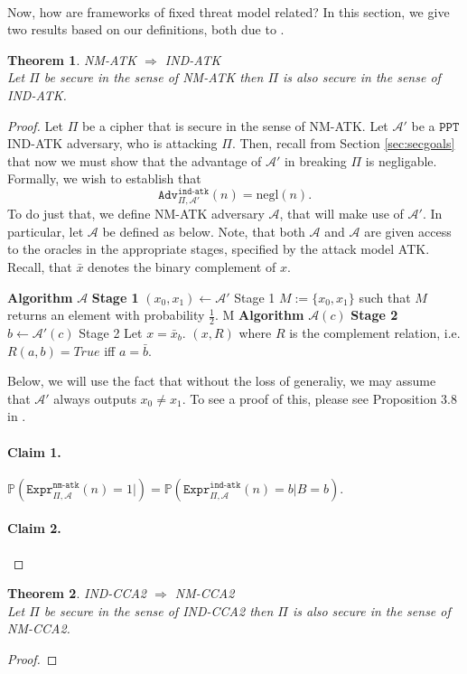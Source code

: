 \documentclass{article}
\newtheorem{theorem}{Theorem}[section]
\theoremstyle{definition}
\newcommand{\A}{\mathcal{A}}
\newcommand{\Prob}{\mathbb{P}}
\newcommand{\PPT}{\texttt{PPT}}
\newcommand{\negl}{\text{negl}}
\newcommand{\Expr}[2]{\texttt{Expr}^{\texttt{#1}}_{#2}}
\newcommand{\Adv}[2]{\texttt{Adv}^{\texttt{#1}}_{#2}}
\begin{document}
\paragraph{} Now, how are frameworks of fixed threat model related? In this
section, we give two results based on our definitions, both due to \cite{bellaresecurityrelations}.
\begin{theorem}{NM-ATK $\Rightarrow$ IND-ATK}\\
  Let $\Pi$ be secure in the sense of NM-ATK then $\Pi$ is also secure in the
  sense of IND-ATK.
\end{theorem}
\begin{proof}
  Let $\Pi$ be a cipher that is secure in the sense of NM-ATK. Let $\A'$ be
  a $\PPT$ IND-ATK adversary, who is attacking $\Pi$. Then, recall from Section
  \ref{sec:secgoals} that now we must show that the advantage of $\A'$ in
  breaking $\Pi$ is negligable. Formally, we wish to establish that
  \[
    \Adv{ind-atk}{\Pi, \A'}(n) = \negl(n).
  \]
  To do just that, we define NM-ATK adversary $\A$, that will make use of $\A'$.
  In particular, let $\A$ be defined as below. Note, that both $\A$ and $\A$ are
  given access to the oracles in the appropriate stages, specified by the attack
  model ATK. Recall, that $\bar{x}$ denotes the binary complement of $x$.
  \begin{algorithmic}
    \State \textbf{Algorithm} $\A$ \textbf{Stage 1}
    \State $(x_0, x_1) \leftarrow \A'$ Stage 1
    \State $M:= \{x_0, x_1\}$ such that $M$ returns an element with probability $\frac12$.
    \State \Return M
    \State
    \State \textbf{Algorithm} $\A(c)$ \textbf{Stage 2}
    \State $b \leftarrow \A'(c)$ Stage 2
    \State Let $x = \bar{x}_b$.
    \State \Return $(x, R)$ where $R$ is the complement relation, i.e. $R(a,
    b) = True$ iff $a = \bar{b}$.
  \end{algorithmic}
  Below, we will use the fact that without the loss of generaliy, we may assume
  that $\A'$ always outputs $x_0 \neq x_1$. To see a proof of this, please see
  Proposition 3.8 in \cite{bellaresecurityrelations}.
  \paragraph{Claim 1.} $\Prob(\Expr{nm-atk}{\Pi, \A}(n) = 1 | ) =
  \Prob(\Expr{ind-atk}{\Pi, \A}(n) = b | B = b)$.
  \paragraph{Claim 2.}
\end{proof}
\begin{theorem}{IND-CCA2 $\Rightarrow$ NM-CCA2}\\
  Let $\Pi$ be secure in the sense of IND-CCA2 then $\Pi$ is also secure in the
  sense of NM-CCA2.
\end{theorem}
\begin{proof}
\end{proof}
\end{document}
